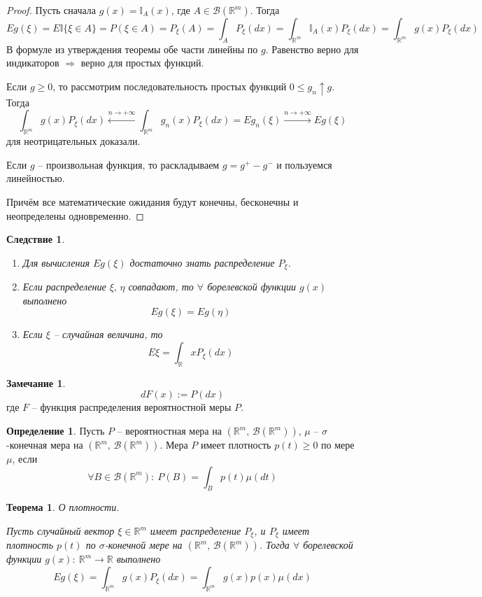 \documentclass[a4paper,12pt]{article}
\renewcommand{\leq}{\ensuremath{\leqslant}}
\renewcommand{\geq}{\ensuremath{\geqslant}}
\theoremstyle{plain}
\newtheorem{theorem}{Теорема}[section]
\newtheorem*{corollary}{Следствие}
\theoremstyle{definition}
\newtheorem{definition}{Определение}[section]
\newtheorem*{note}{Замечание}
\theoremstyle{remark}
\begin{document}
\begin{proof}
	Пусть сначала $g(x) = \mathbb{I}_A(x)$, где $A \in \mathcal{B}(\mathbb{R}^m)$. Тогда
	\[
		Eg(\xi) = E\mathbb{I}\{\xi \in A\} = P(\xi \in A) = P_\xi(A) = \int_A P_\xi(dx) = \int_{\mathbb{R}^m}\mathbb{I}_A(x)P_\xi(dx) = \int_{\mathbb{R}^m}g(x)P_\xi(dx)
	\]
	В формуле из утверждения теоремы обе части линейны по $g$. Равенство верно для индикаторов $\Rightarrow$ верно для простых функций.

	Если $g \geq 0$, то рассмотрим последовательность простых функций $0 \leq g_n \uparrow g$. Тогда
	\[\int_{\mathbb{R}^m}g(x)P_\xi(dx) \stackrel{n \to +\infty}{\leftarrow} \int_{\mathbb{R}^m}g_n(x)P_\xi(dx) = Eg_n(\xi) \stackrel{n \to +\infty}{\to} Eg(\xi)\]
	для неотрицательных доказали.

	Если $g$ -- произвольная функция, то раскладываем $g = g^+ - g^-$ и пользуемся линейностью.

	Причём все математические ожидания будут конечны, бесконечны и неопределены одновременно.
\end{proof}

\begin{corollary}
	\begin{enumerate}
		\item Для вычисления $Eg(\xi)$ достаточно знать распределение $P_\xi$.
		\item Если распределение $\xi,\, \eta$ совпадают, то $\forall$ борелевской функции $g(x)$ выполнено
		      \[Eg(\xi) = Eg(\eta)\]
		\item Если $\xi$ -- случайная величина, то
		      \[E\xi = \int_\mathbb{R} xP_\xi(dx)\]
	\end{enumerate}
\end{corollary}

\begin{note}
	\[dF(x) := P(dx)\]
	где $F$ -- функция распределения вероятностной меры $P$.
\end{note}

\begin{definition}
	Пусть $P$ -- вероятностная мера на $(\mathbb{R}^m,\, \mathcal{B}(\mathbb{R}^m))$, $\mu$ -- $\sigma$-конечная мера на $(\mathbb{R}^m,\, \mathcal{B}(\mathbb{R}^m))$. Мера $P$ имеет плотность $p(t) \geq 0$ по мере $\mu$, если
	\[\forall B \in \mathcal{B}(\mathbb{R}^m) :\: P(B) = \int_B p(t)\mu(dt)\]
\end{definition}

\begin{theorem}
	О плотности.

	Пусть случайный вектор $\xi \in \mathbb{R}^m$ имеет распределение $P_\xi$, и $P_\xi$ имеет плотность $p(t)$ по $\sigma$-конечной мере на $(\mathbb{R}^m,\, \mathcal{B}(\mathbb{R}^m))$. Тогда $\forall$ борелевской функции $g(x) :\: \mathbb{R}^m \to \mathbb{R}$ выполнено
	\[Eg(\xi) = \int_{\mathbb{R}^m}g(x)P_\xi(dx) = \int_{\mathbb{R}^m}g(x)p(x)\mu(dx)\]
\end{theorem}
\end{document}
